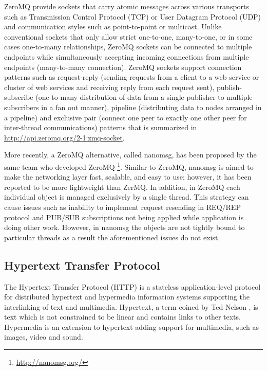 \documentclass[a4paper,11pt,twoside]{article}
\begin{document}
ZeroMQ provide sockets that carry atomic messages across various transports such as Transmission Control Protocol (TCP) or User Datagram Protocol (UDP) and communication styles such as point-to-point or multicast. Unlike conventional sockets that only allow strict one-to-one, many-to-one, or in some cases one-to-many relationships, ZeroMQ sockets can be connected to multiple endpoints while simultaneously accepting incoming connections from multiple endpoints (many-to-many connection). ZeroMQ sockets support connection patterns such as request-reply (sending requests from a client to a web service or cluster of web services and receiving reply from each request sent), publish-subscribe (one-to-many distribution of data from a single publisher to multiple subscribers in a fan out manner), pipeline (distributing data to nodes arranged in a pipeline) and exclusive pair (connect one peer to exactly one other peer for inter-thread communications) patterns that is summarized in \url{http://api.zeromq.org/2-1:zmq-socket}.      

More recently, a ZeroMQ alternative, called nanomsg, has been proposed by the same team who developed ZeroMQ \footnote{\label{nanomsg} \url{http://nanomsg.org/}}. Similar to ZeroMQ, nanomsg is aimed to make the networking layer fast, scalable, and easy to use; however, it has been reported to be more lightweight than ZerMQ. In addition, in ZeroMQ each individual object is managed exclusively by a single thread. This strategy can cause issues such as inability to implement request resending in REQ/REP protocol and PUB/SUB subscriptions not being applied while application is doing other work. However, in nanomsg the objects are not tightly bound to particular threads as a result the aforementioned issues do not exist. 


\subsection{Hypertext Transfer Protocol} \label{HTTP}
The Hypertext Transfer Protocol (HTTP) is a stateless application-level protocol for distributed hypertext and hypermedia information systems supporting the interlinking of text and multimedia.  Hypertext, a term coined by Ted Nelson \cite{hypertext}, is text which is not constrained to be linear and contains links to other texts.  Hypermedia is an extension to hypertext adding support for multimedia, such as images, video and sound.
\end{document}
